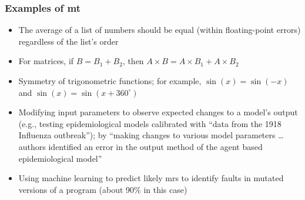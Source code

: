 \subsubsection{Examples of \acs{mt}}
\begin{itemize}
      \item The average of a list of numbers should be equal (within
            floating-point errors) regardless of the list's order
            \cite[p.~67]{kanewala_metamorphic_2019}
      \item For matrices, if $B = B_1 + B_2$, then $A \times B = A \times B_1
                  + A \times B_2$ \cite[pp.~68-69]{kanewala_metamorphic_2019}
      \item Symmetry of trigonometric functions; for example, $\sin(x) = \sin(-x)$
            and $\sin(x) = \sin(x + 360^{\circ})$ \cite[p.~70]{kanewala_metamorphic_2019}
      \item Modifying input parameters to observe expected changes to a model's
            output (e.g., testing epidemiological models calibrated with
            ``data from the 1918 Influenza outbreak''); by ``making changes to
            various model parameters \dots authors identified an error in the
            output method of the agent based epidemiological model''
            \cite[p.~70]{kanewala_metamorphic_2019}
      \item Using machine learning to predict likely \acsp{mr} to identify
            faults in mutated versions of a program (about 90\% in this case)
            \cite[p.~71]{kanewala_metamorphic_2019}
\end{itemize}
